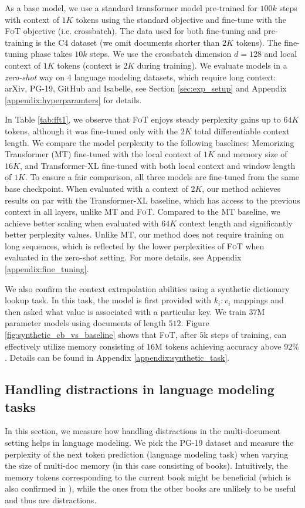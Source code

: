 As a base model, we use a standard transformer model pre-trained for $100k$ steps with context of $1K$ tokens using the standard objective and fine-tune with the \textsc{FoT} objective (i.e. crossbatch). The data used for both fine-tuning and pre-training is the C4 dataset \cite{c42019t5} (we omit documents shorter than $2K$ tokens). The fine-tuning phase takes $10k$ steps. We use the crossbatch dimension $d=128$ and local context of $1K$ tokens (context is $2K$ during training). We evaluate models in a \emph{zero-shot} way on $4$ language modeling datasets, which require long context: arXiv, PG-19, GitHub and Isabelle, see Section \ref{sec:exp_setup} and Appendix \ref{appendix:hyperparamters} for details. 

In Table \ref{tab:fft1}, we observe that \textsc{FoT} enjoys steady perplexity gains up to $64K$ tokens, although it was fine-tuned only with the $2K$ total differentiable context length. We compare the model perplexity to the following baselines: Memorizing Transformer (MT) \citep{wu2022memorizing} fine-tuned with the local context of $1K$ and memory size of $16K$, and Transformer-XL \citep{dai2019transformerxl} fine-tuned with both local context and window length of $1K$. To ensure a fair comparison, all three models are fine-tuned from the same base checkpoint. When evaluated with a context of $2K$, our method achieves results on par with the Transformer-XL baseline, which has access to the previous context in all layers, unlike MT and \textsc{FoT}. Compared to the MT baseline, we achieve better scaling when evaluated with $64K$ context length and significantly better perplexity values. Unlike MT, our method does not require training on long sequences, which is reflected by the lower perplexities of \textsc{FoT} when evaluated in the zero-shot setting. For more details, see Appendix \ref{appendix:fine_tuning}.   

{We also confirm the context extrapolation abilities using a synthetic dictionary lookup task. In this task, the model is first provided with $k_i: v_i$ mappings and then asked what value is associated with a particular key.  We train $37$M parameter  models using documents of length $512$. Figure \ref{fig:synthetic_cb_vs_baseline} shows that \textsc{FoT}, after $5$k steps of training, can effectively utilize memory consisting of $16$M tokens achieving accuracy above $92\%$. Details can be found in Appendix \ref{appendix:synthetic_task}.}

\subsection{Handling distractions in language modeling tasks}\label{sec:distractions}
 In this section, we measure how handling distractions in the multi-document setting helps in language modeling. We pick the PG-19 dataset \citep{raecompressive2019} and measure the perplexity of the next token prediction (language modeling task) when varying the size of multi-doc memory (in this case consisting of books). Intuitively, the memory tokens corresponding to the current book might be beneficial (which is also confirmed in \citep{wu2022memorizing}), while the ones from the other books are unlikely to be useful and thus are distractions. 

